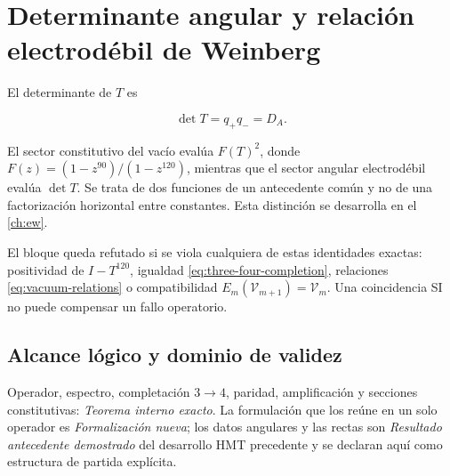 \section{Determinante angular y relaci\'on electrod\'ebil de Weinberg}

El determinante de \(T\) es

\begin{equation}
\det T=q_+q_-=D_A.
\label{eq:detT}
\end{equation}

El sector constitutivo del vac\'io eval\'ua \(F(T)^2\), donde
\(F(z)=(1-z^{90})/(1-z^{120})\), mientras que el sector angular
electrod\'ebil eval\'ua \(\det T\). Se trata de dos funciones de un
antecedente com\'un y no de una factorizaci\'on horizontal entre constantes.
Esta distinci\'on se desarrolla en el \cref{ch:ew}.

\begin{remark}
El bloque queda refutado si se viola cualquiera de estas identidades exactas:
positividad de \(I-T^{120}\), igualdad
\cref{eq:three-four-completion}, relaciones \cref{eq:vacuum-relations} o
compatibilidad \(E_m(\mathcal V_{m+1})=\mathcal V_m\). Una coincidencia SI
no puede compensar un fallo operatorio.
\end{remark}

\subsection*{Alcance lógico y dominio de validez}
Operador, espectro, completaci\'on \(3\to4\), paridad, amplificaci\'on y secciones constitutivas: \emph{Teorema interno exacto}. La formulaci\'on que los re\'une en un solo operador es \emph{Formalizaci\'on nueva}; los datos angulares y las rectas son \emph{Resultado antecedente demostrado} del desarrollo HMT precedente y se declaran aqu\'i como estructura de partida expl\'icita.

